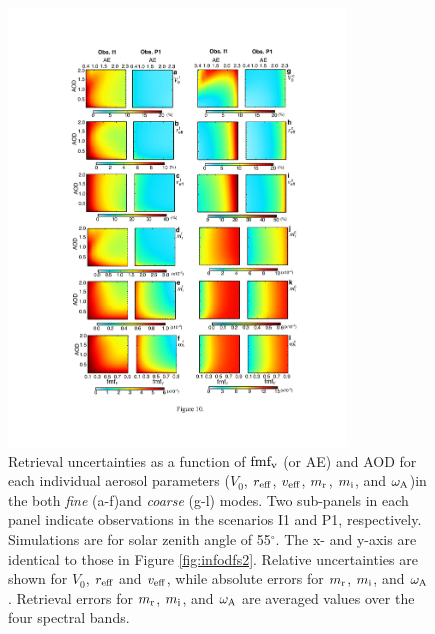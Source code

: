 \begin{figure}[p]
  \centering
  \includegraphics[width={0.8\textwidth}]{figures/info10.pdf}
  \caption[Retrieval uncertainties as a function of $\fmfv$ (or AE) and
AOD for each individual aerosol parameters in the both \textit{fine} and
\textit{coarse} modes.]
{Retrieval uncertainties as a function of $\fmfv$ (or AE) and
AOD for each individual aerosol parameters ($V_0$, $r_\text{eff}$, $v_\text{eff}$,
$m_\text{r}$, $m_\text{i}$, and $\omega_\text{A}$)in the both \textit{fine} (a-f)and 
\textit{coarse} (g-l) modes.
Two sub-panels in each panel indicate observations in the scenarios 
I1 and P1, respectively. Simulations are for solar zenith angle of
55$^\circ$. The x- and y-axis are identical to those in Figure
\ref{fig:infodfs2}. Relative uncertainties are shown for
$V_0$, $r_\text{eff}$ and $v_\text{eff}$, while absolute errors for $m_\text{r}$, $m_\text{i}$, 
and $\omega_\text{A}$. Retrieval errors for $m_\text{r}$, $m_\text{i}$, 
and $\omega_\text{A}$ are averaged values over the four spectral bands.}
  \label{fig:infoerr}
\end{figure}

